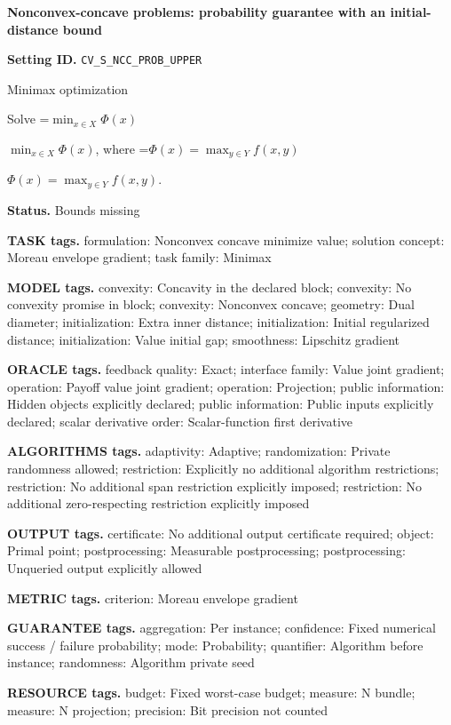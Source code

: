 \documentclass[10pt,a4paper]{article}
\newcommand{\AtlasMath}[1]{\par\begingroup\centering\setbox0=\hbox{$\displaystyle #1$}\ifdim\wd0>1.4\linewidth\typeout{ATLAS WIDE FORMULA: \the\wd0}\fi\ifdim\wd0>\linewidth\resizebox{\linewidth}{!}{\box0}\else\box0\fi\par\endgroup}
\newcommand{\AtlasInlineMath}[1]{\begingroup\setbox0=\hbox{$#1$}\ifdim\wd0>.4\linewidth\endgroup\AtlasMath{#1}\else\endgroup$#1$\fi}
\begin{document}
\raggedright

{\LARGE\bfseries\sffamily\color{AtlasNavy} Nonconvex-concave problems: probability guarantee with an initial-distance bound\par}\vspace{5pt}
\textbf{Setting ID.} \texttt{CV\_\allowbreak{}S\_\allowbreak{}NCC\_\allowbreak{}PROB\_\allowbreak{}UPPER}

Minimax optimization

Solve \AtlasInlineMath{\min_{x\in X}\Phi(x)}, where \AtlasInlineMath{\Phi(x)=\max_{y\in Y}f(x,y)}.

\textbf{Status.} Bounds missing

\textbf{TASK tags.} formulation: Nonconvex concave minimize value; solution concept: Moreau envelope gradient; task family: Minimax

\textbf{MODEL tags.} convexity: Concavity in the declared block; convexity: No convexity promise in block; convexity: Nonconvex concave; geometry: Dual diameter; initialization: Extra inner distance; initialization: Initial regularized distance; initialization: Value initial gap; smoothness: Lipschitz gradient

\textbf{ORACLE tags.} feedback quality: Exact; interface family: Value joint gradient; operation: Payoff value joint gradient; operation: Projection; public information: Hidden objects explicitly declared; public information: Public inputs explicitly declared; scalar derivative order: Scalar-function first derivative

\textbf{ALGORITHMS tags.} adaptivity: Adaptive; randomization: Private randomness allowed; restriction: Explicitly no additional algorithm restrictions; restriction: No additional span restriction explicitly imposed; restriction: No additional zero-respecting restriction explicitly imposed

\textbf{OUTPUT tags.} certificate: No additional output certificate required; object: Primal point; postprocessing: Measurable postprocessing; postprocessing: Unqueried output explicitly allowed

\textbf{METRIC tags.} criterion: Moreau envelope gradient

\textbf{GUARANTEE tags.} aggregation: Per instance; confidence: Fixed numerical success / failure probability; mode: Probability; quantifier: Algorithm before instance; randomness: Algorithm private seed

\textbf{RESOURCE tags.} budget: Fixed worst-case budget; measure: N bundle; measure: N projection; precision: Bit precision not counted
\end{document}
